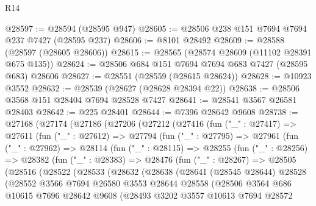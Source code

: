 \begin{lexlean}{R14}
\begin{coremodule}
@28597 := @28594 (@28595 @947)
@28605 := @28506 @238 @151 @7694 @7694 @237 @7427 (@28595 @237)
@28606 := @8101 @28492
@28609 := @28588 (@28597 (@28605 @28606))
@28615 := @28565 (@28574 @28609 (@11102 @28391 @675 @135))
@28624 := @28506 @684 @151 @7694 @7694 @683 @7427 (@28595 @683) @28606
@28627 := @28551 (@28559 (@28615 @28624))
@28628 := @10923 @3552
@28632 := @28539 (@28627 (@28628 @28394 @22))
@28638 := @28506 @3568 @151 @28404 @7694 @28528 @7427
@28641 := @28541 @3567 @26581 @28403
@28642 := @225 @28401
@28644 := @7396 @28642 @9608
@28738 := @27168
    (@27174
      (@27186
        (@27206
          (@27212
            (@27416
              (fun ("_" : @27417) =>
              @27611
                (fun ("_" : @27612) =>
                @27794
                  (fun ("_" : @27795) =>
                  @27961
                    (fun ("_" : @27962) =>
                    @28114
                      (fun ("_" : @28115) =>
                      @28255
                        (fun ("_" : @28256) =>
                        @28382
                          (fun ("_" : @28383) =>
                          @28476
                            (fun ("_" : @28267) =>
                            @28505
                              (@28516
                                (@28522
                                  (@28533
                                    (@28632
                                      (@28638
                                        (@28641
                                          (@28545 @28644)
                                          @28528
                                          (@28552
                                            @3566
                                            @7694
                                            @26580
                                            @3553
                                            @28644
                                            @28558
                                            (@28506
                                              @3564
                                              @686
                                              @10615
                                              @7696
                                              @28642
                                              @9608
                                              (@28493
                                                @3202
                                                @3557
                                                @10613
                                                @7694
                                                @28572

\end{coremodule}
\end{lexlean}

